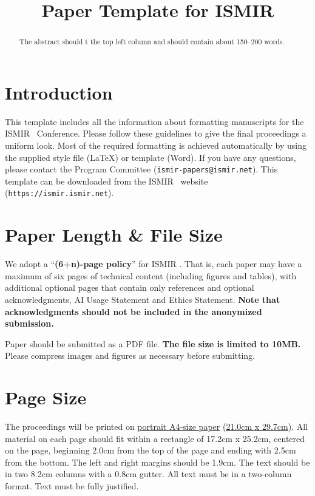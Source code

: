 \documentclass{article}
\title{Paper Template for ISMIR \conferenceyear}
\begin{document}
\maketitle

\begin{abstract}
The abstract should t the top left column and should contain about 150--200 words.
\end{abstract}

\section{Introduction}\label{sec:introduction}

This template includes all the information about formatting manuscripts for the ISMIR \conferenceyear\ Conference. Please follow these guidelines to give the final proceedings a uniform look. Most of the required formatting is achieved automatically by using the supplied style file (\LaTeX) or template (Word). If you have any questions, please contact the Program Committee (\texttt{ismir\conferenceyear-papers@ismir.net}). This template can be downloaded from the ISMIR \conferenceyear\ website (\texttt{https://ismir\conferenceyear.ismir.net}).

\section{Paper Length \& File Size}

We adopt a ``\textbf{(6+n)-page policy}'' for ISMIR \conferenceyear. That is, each paper may have a maximum of six pages of technical content (including figures and tables), with additional optional pages that contain only references and optional acknowledgments, AI Usage Statement and Ethics Statement. \textbf{Note that acknowledgments should not be included in the anonymized submission.}

Paper should be submitted as a PDF file. \textbf{The file size is limited to 10MB.} Please compress images and figures as necessary before submitting.

\section{Page Size}\label{sec:page_size}

The proceedings will be printed on \underline{portrait A4-size paper} \underline{(21.0cm x 29.7cm)}. All material on each page should fit within a rectangle of 17.2cm x 25.2cm, centered on the page, beginning 2.0cm from the top of the page and ending with 2.5cm from the bottom. The left and right margins should be 1.9cm. The text should be in two 8.2cm columns with a 0.8cm gutter. All text must be in a two-column format. Text must be fully justified.
\end{document}
